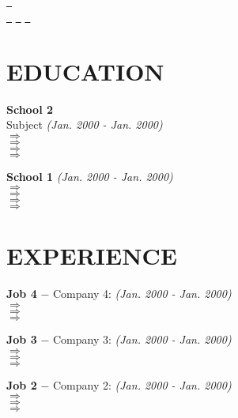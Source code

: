 \documentclass[letterpaper,1pt]{article}
\def\titlesection{
\begin{center}
    {\Huge \scshape \firstname \ \lastname} \\ \vspace{1pt}
    {\small \scshape \bio} \\ 
    \href{mailto:\email}{\raisebox{-0.2\height}\faEnvelope\  \underline{\email}} \\ 
    \href{\linkedin}{\raisebox{-0.2\height}\faLinkedin\ \underline{\linkedin}}  
    \href{\globe}{\raisebox{-0.2\height}\faGlobe\ \underline{\globe}}
    \href{\github}{\raisebox{-0.2\height}\faGithub\ \underline{\github}}
    \vspace{-18pt}
\end{center}
}
\begin{document}
\titlesection
\begin{figure}[htbp]

\end{figure}

\section*{EDUCATION}
\textbf{School 2}\\
Subject
\hfill \textit{(Jan. 2000 - Jan. 2000)}\\
\vspace{0.1cm}
$\Rightarrow$  \\
$\Rightarrow$ \\
$\Rightarrow$ \\
$\Rightarrow$

\vspace{0.3cm}
\textbf {School 1}
\hfill \textit{(Jan. 2000 - Jan. 2000)}\\
\vspace{0.1cm}
$\Rightarrow$ \\
$\Rightarrow$ \\
$\Rightarrow$ \\
$\Rightarrow$ \\

\section*{EXPERIENCE}
{\textbf{Job 4} $-$ Company 4:}\hfill \textit{ (Jan. 2000 - Jan. 2000)}\\
$\Rightarrow$ \\
$\Rightarrow$ \\
$\Rightarrow$ \\
\vspace{0.2cm}

{\textbf{Job 3} $-$ Company 3:}\hfill \textit{ (Jan. 2000 - Jan. 2000)}\\
$\Rightarrow$ \\
$\Rightarrow$ \\
$\Rightarrow$ \\
\vspace{0.2cm}

{\textbf{Job 2} $-$ Company 2:} \hfill \textit{ (Jan. 2000 - Jan. 2000)}\\
$\Rightarrow$ \\
$\Rightarrow$ \\
$\Rightarrow$ \\
\vspace{0.2cm}
\end{document}
